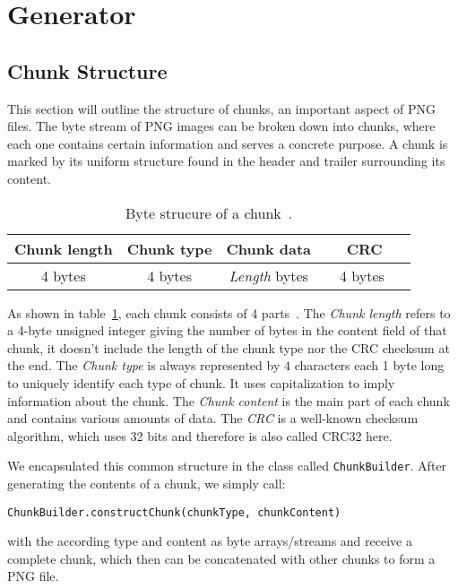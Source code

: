 \documentclass[runningheads]{llncs}
\begin{document}
\section{Generator}
\subsection{Chunk Structure}
\label{chunk_structure}
This section will outline the structure of chunks, an important aspect of PNG files. The byte stream of PNG images can be broken down into chunks, where each one contains certain information and serves a concrete purpose. A chunk is marked by its uniform structure found in the header and trailer surrounding its content.
\begin{table}
    \caption{Byte strucure of a chunk~\cite{libpng_file_structure}.}
    \label{tab1}
    \begin{center}
        \begin{tabular}{|c|c|c|c|}
            \hline 
            \rule{0pt}{3ex}
            \textbf{ Chunk length } & \textbf{ Chunk type } & \textbf{   Chunk data   } & \textbf{   CRC   } \\ [0.5ex] 
            \hline \hline
            \rule{0pt}{3ex} 
            4 bytes               & 4 bytes             & \textit{Length} bytes        & \ \ 4 bytes \ \     \\ [0.5ex] 
            \hline
        \end{tabular}              
    \end{center}
\end{table}

As shown in table~\ref{tab1}, each chunk consists of 4 parts~\cite{libpng_file_structure}. 
The \textit{Chunk length} refers to a 4-byte unsigned integer giving the number of bytes in the content field of that chunk, it doesn't include the length of the chunk type nor the CRC checksum at the end.
The \textit{Chunk type} is always represented by 4 characters each 1 byte long to uniquely identify each type of chunk. It uses capitalization to imply information about the chunk.
The \textit{Chunk content} is the main part of each chunk and contains various amounts of data.
The \textit{CRC} is a well-known checksum algorithm, which uses 32 bits and therefore is also called CRC32 here.

We encapsulated this common structure in the class called \texttt{ChunkBuilder}. After generating the contents of a chunk, we simply call: 
\begin{center}
\texttt{ChunkBuilder.constructChunk(chunkType, chunkContent)} 
\end{center}
with the according type and content as byte arrays/streams and receive a complete chunk, which then can be concatenated with other chunks to form a PNG file. 
\end{document}
